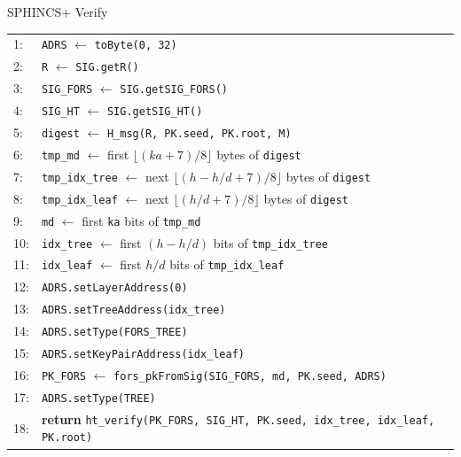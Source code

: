 \documentclass [version=submission]{iacrcc}
\begin{document}
\begin{subsection}{SPHINCS+ Verify}
\begin{algorithm}
    \begin{tabular}{ll}
        1:  & \texttt{ADRS} $\leftarrow$ \texttt{toByte(0, 32)} \\
        2:  & \texttt{R} $\leftarrow$ \texttt{SIG.getR()} \\
        3:  & \texttt{SIG\_FORS} $\leftarrow$ \texttt{SIG.getSIG\_FORS()} \\
        4:  & \texttt{SIG\_HT} $\leftarrow$ \texttt{SIG.getSIG\_HT()} \\
        5:  & \texttt{digest} $\leftarrow$ \texttt{H\_msg(R, PK.seed, PK.root, M)} \\
        6:  & \texttt{tmp\_md} $\leftarrow$ first $\lfloor(\mathit{ka}+7)/8\rfloor$ bytes of \texttt{digest} \\
        7:  & \texttt{tmp\_idx\_tree} $\leftarrow$ next $\lfloor(h - h/d +7)/8\rfloor$ bytes of \texttt{digest} \\
        8:  & \texttt{tmp\_idx\_leaf} $\leftarrow$ next $\lfloor(h/d +7)/8\rfloor$ bytes of \texttt{digest} \\
        9:  & \texttt{md} $\leftarrow$ first \texttt{ka} bits of \texttt{tmp\_md} \\
        10: & \texttt{idx\_tree} $\leftarrow$ first $(h - h/d)$ bits of \texttt{tmp\_idx\_tree} \\
        11: & \texttt{idx\_leaf} $\leftarrow$ first $h/d$ bits of \texttt{tmp\_idx\_leaf} \\
        12: & \texttt{ADRS.setLayerAddress(0)} \\
        13: & \texttt{ADRS.setTreeAddress(idx\_tree)} \\
        14: & \texttt{ADRS.setType(FORS\_TREE)} \\
        15: & \texttt{ADRS.setKeyPairAddress(idx\_leaf)} \\
        16: & \texttt{PK\_FORS} $\leftarrow$ \texttt{fors\_pkFromSig(SIG\_FORS, md, PK.seed, ADRS)} \\
        17: & \texttt{ADRS.setType(TREE)} \\
        18: & \textbf{return} \texttt{ht\_verify(PK\_FORS, SIG\_HT, PK.seed, idx\_tree, idx\_leaf, PK.root)} \\
    \end{tabular}
\end{algorithm}


\end{subsection}
\end{document}
